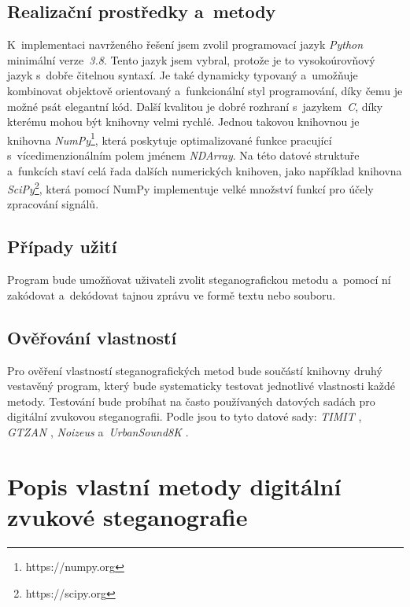 \subsection*{Realizační prostředky a~metody}
\label{sub:solution-tool-choices}

K~implementaci navrženého řešení jsem zvolil programovací jazyk \textit{Python}
minimální verze~\textit{3.8}. Tento jazyk jsem vybral, protože je to
vysokoúrovňový jazyk s~dobře čitelnou syntaxí. Je také dynamicky typovaný
a~umožňuje kombinovat objektově orientovaný a~funkcionální styl programování,
díky čemu je možné psát elegantní kód. Další kvalitou je dobré rozhraní
s~jazykem~\textit{C}, díky kterému mohou být knihovny velmi rychlé. Jednou
takovou knihovnou je knihovna \textit{NumPy}\footnote{https://numpy.org}, která
poskytuje optimalizované funkce pracující s~vícedimenzionálním polem jménem
\textit{NDArray}. Na této datové struktuře a~funkcích staví celá řada dalších
numerických knihoven, jako například knihovna
\textit{SciPy}\footnote{https://scipy.org}, která pomocí NumPy implementuje
velké množství funkcí pro účely zpracování signálů.

\subsection*{Případy užití}
\label{sub:use-cases}

Program bude umožňovat uživateli zvolit steganografickou metodu a~pomocí ní
zakódovat a~dekódovat tajnou zprávu ve formě textu nebo souboru.

\subsection*{Ověřování vlastností}
\label{sub:method-property-verification}

Pro ověření vlastností steganografických metod bude součástí knihovny druhý
vestavěný program, který bude systematicky testovat jednotlivé vlastnosti každé
metody. Testování bude probíhat na často používaných datových sadách pro
digitální zvukovou steganografii. Podle \cite{AlSabhany2020} jsou to tyto
datové sady: \textit{TIMIT} \cite{Garofolo1993}, \textit{GTZAN}
\cite{Tzanetakis2001}, \textit{Noizeus} \cite{Hu2006} a~\textit{UrbanSound8K}
\cite{Salamon2014}.

\section{Popis vlastní metody digitální zvukové steganografie}
\label{sec:own-method-proposal}

